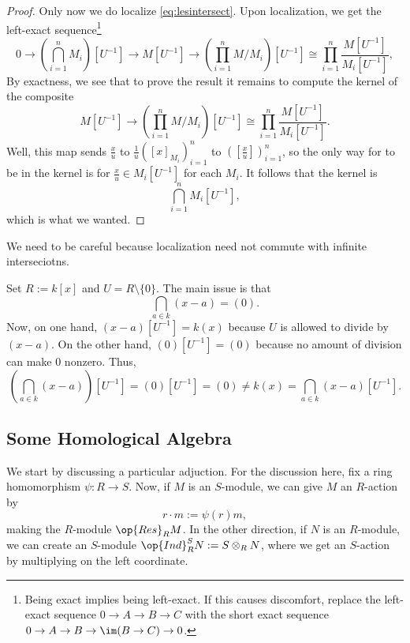 \begin{proof}
	Only now we do localize \autoref{eq:lesintersect}. Upon localization, we get the left-exact sequence\footnote{Being exact implies being left-exact. If this causes discomfort, replace the left-exact sequence $0\to A\to B\to C$ with the short exact sequence $0\to A\to B\to\im(B\to C)\to0$.}
	\[0\to\left(\bigcap_{i=1}^nM_i\right)\left[U^{-1}\right]\to M\left[U^{-1}\right]\to\left(\prod_{i=1}^nM/M_i\right)\left[U^{-1}\right]\cong\prod_{i=1}^n\frac{M\left[U^{-1}\right]}{M_i\left[U^{-1}\right]},\]
	By exactness, we see that to prove the result it remains to compute the kernel of the composite
	\[M\left[U^{-1}\right]\to\left(\prod_{i=1}^nM/M_i\right)\left[U^{-1}\right]\cong\prod_{i=1}^n\frac{M\left[U^{-1}\right]}{M_i\left[U^{-1}\right]}.\]
	Well, this map sends $\frac xu$ to $\frac1u([x]_{M_i})_{i=1}^n$ to $\left([\frac xu]\right)_{i=1}^n$, so the only way for to be in the kernel is for $\frac xu\in M_i\left[U^{-1}\right]$ for each $M_i$. It follows that the kernel is
	\[\bigcap_{i=1}^nM_i\left[U^{-1}\right],\]
	which is what we wanted.
\end{proof}
We need to be careful because localization need not commute with infinite interseciotns.
\begin{example}
	Set $R:=k[x]$ and $U=R\setminus\{0\}$. The main issue is that
	\[\bigcap_{a\in k}(x-a)=(0).\]
	Now, on one hand, $(x-a)\left[U^{-1}\right]=k(x)$ because $U$ is allowed to divide by $(x-a)$. On the other hand, $(0)\left[U^{-1}\right]=(0)$ because no amount of division can make $0$ nonzero. Thus,
	\[\left(\bigcap_{a\in k}(x-a)\right)\left[U^{-1}\right]=(0)\left[U^{-1}\right]=(0)\ne k(x)=\bigcap_{a\in k}(x-a)\left[U^{-1}\right].\]
\end{example}

\subsection{Some Homological Algebra}
We start by discussing a particular adjuction. For the discussion here, fix a ring homomorphism $\psi:R\to S$. Now, if $M$ is an $S$-module, we can give $M$ an $R$-action by
\[r\cdot m:=\psi(r)m,\]
making the $R$-module $\op{Res}_RM$. In the other direction, if $N$ is an $R$-module, we can create an $S$-module $\op{Ind}_R^SN:=S\otimes_RN$, where we get an $S$-action by multiplying on the left coordinate.

